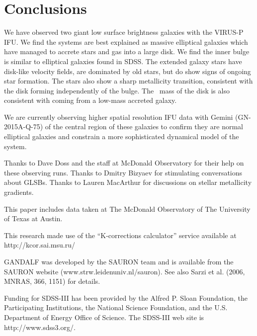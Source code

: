 \documentclass{emulateapj}
\newcommand\HI{\ion{H}{1}}
\begin{document}
\section{Conclusions}

We have observed two giant low surface brightness galaxies with the VIRUS-P IFU.  We find the systems are best explained as massive elliptical galaxies which have managed to accrete stars and gas into a large disk.  We find the inner bulge is similar to elliptical galaxies found in SDSS.  The extended galaxy stars have disk-like velocity fields, are dominated by old stars, but do show signs of ongoing star formation. The stars also show a sharp metallicity transition, consistent with the disk forming independently of the bulge. The \HI\ mass of the disk is also consistent with coming from a low-mass accreted galaxy.

We are currently observing higher spatial resolution IFU data with Gemini (GN-2015A-Q-75) of the central region of these galaxies to confirm they are normal elliptical galaxies and constrain a more sophisticated dynamical model of the system.

\acknowledgments
Thanks to Dave Doss and the staff at McDonald Observatory for their help on these observing runs. Thanks to Dmitry Bizyaev for stimulating conversations about GLSBs. Thanks to Lauren MacArthur for discussions on stellar metallicity gradients.

This paper includes data taken at The McDonald Observatory of The University of Texas at Austin.


This research made use of the ``K-corrections calculator'' service available at http://kcor.sai.msu.ru/

GANDALF was developed by the SAURON team and is available from the SAURON website (www.strw.leidenuniv.nl/sauron). See also Sarzi et al. (2006, MNRAS, 366, 1151) for details.

Funding for SDSS-III has been provided by the Alfred P. Sloan Foundation, the Participating Institutions, the National Science Foundation, and the U.S. Department of Energy Office of Science. The SDSS-III web site is http://www.sdss3.org/.
\end{document}
